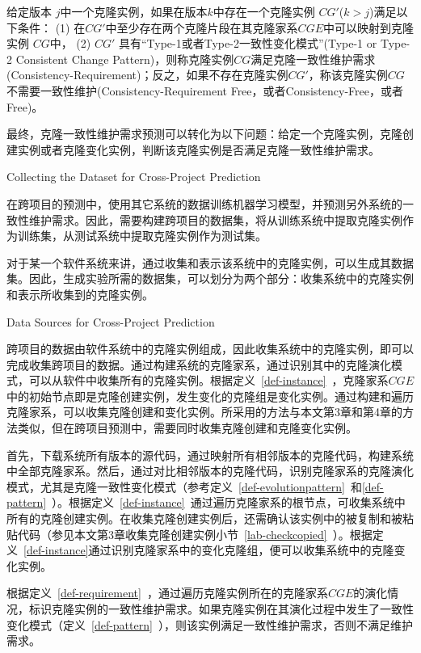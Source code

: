 \begin{definition}[克隆一致性维护需求] 
 \label{def-requirement}
给定版本 $j$中一个克隆实例，如果在版本$k$中存在一个克隆实例 $CG'$($k>j$)满足以下条件： (1) 在$CG'$中至少存在两个克隆片段在其克隆家系$CGE$中可以映射到克隆实例 $CG$中， (2) $CG'$ 具有“Type-1或者Type-2一致性变化模式”(Type-1 or Type-2 Consistent Change Pattern)，则称克隆实例$CG$满足克隆一致性维护需求(Consistency-Requirement)；反之，如果不存在克隆实例$CG'$，称该克隆实例$CG$不需要一致性维护(Consistency-Requirement Free，或者Consistency-Free，或者Free)。
\end{definition}

最终，克隆一致性维护需求预测可以转化为以下问题：给定一个克隆实例，克隆创建实例或者克隆变化实例，判断该克隆实例是否满足克隆一致性维护需求。

{Collecting the Dataset for Cross-Project Prediction}

在跨项目的预测中，使用其它系统的数据训练机器学习模型，并预测另外系统的一致性维护需求。因此，需要构建跨项目的数据集，将从训练系统中提取克隆实例作为训练集，从测试系统中提取克隆实例作为测试集。

对于某一个软件系统来讲，通过收集和表示该系统中的克隆实例，可以生成其数据集。因此，生成实验所需的数据集，可以划分为两个部分：收集系统中的克隆实例和表示所收集到的克隆实例。

{Data Sources for Cross-Project Prediction}

跨项目的数据由软件系统中的克隆实例组成，因此收集系统中的克隆实例，即可以完成收集跨项目的数据。通过构建系统的克隆家系，通过识别其中的克隆演化模式，可以从软件中收集所有的克隆实例。根据定义~\ref{def-instance}~，克隆家系$CGE$中的初始节点即是克隆创建实例，发生变化的克隆组是变化实例。通过构建和遍历克隆家系，可以收集克隆创建和变化实例。所采用的方法与本文第3章和第4章的方法类似，但在跨项目预测中，需要同时收集克隆创建和克隆变化实例。

首先，下载系统所有版本的源代码，通过映射所有相邻版本的克隆代码，构建系统中全部克隆家系。然后，通过对比相邻版本的克隆代码，识别克隆家系的克隆演化模式，尤其是克隆一致性变化模式（参考定义~\ref{def-evolutionpattern}~和\ref{def-pattern}~）。根据定义~\ref{def-instance}~通过遍历克隆家系的根节点，可收集系统中所有的克隆创建实例。在收集克隆创建实例后，还需确认该实例中的被复制和被粘贴代码（参见本文第3章收集克隆创建实例小节~\ref{lab-checkcopied}~）。根据定义~\ref{def-instance}通过识别克隆家系中的变化克隆组，便可以收集系统中的克隆变化实例。

根据定义~\ref{def-requirement}~，通过遍历克隆实例所在的克隆家系$CGE$的演化情况，标识克隆实例的一致性维护需求。如果克隆实例在其演化过程中发生了一致性变化模式（定义~\ref{def-pattern}~），则该实例满足一致性维护需求，否则不满足维护需求。

